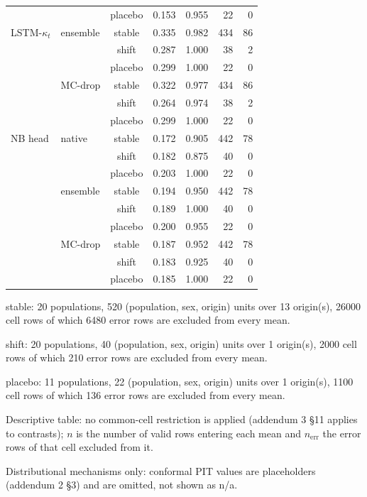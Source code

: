 {\begin{longtable}{@{}llcrrrr@{}}
 &  & placebo & 0.153 & 0.955 & 22 & 0 \\
\addlinespace[2pt]
LSTM-$\kappa_t$ & ensemble & stable & 0.335 & 0.982 & 434 & 86 \\
 &  & shift & 0.287 & 1.000 & 38 & 2 \\
 &  & placebo & 0.299 & 1.000 & 22 & 0 \\
 & MC-drop & stable & 0.322 & 0.977 & 434 & 86 \\
 &  & shift & 0.264 & 0.974 & 38 & 2 \\
 &  & placebo & 0.299 & 1.000 & 22 & 0 \\
\addlinespace[2pt]
NB head & native & stable & 0.172 & 0.905 & 442 & 78 \\
 &  & shift & 0.182 & 0.875 & 40 & 0 \\
 &  & placebo & 0.203 & 1.000 & 22 & 0 \\
 & ensemble & stable & 0.194 & 0.950 & 442 & 78 \\
 &  & shift & 0.189 & 1.000 & 40 & 0 \\
 &  & placebo & 0.200 & 0.955 & 22 & 0 \\
 & MC-drop & stable & 0.187 & 0.952 & 442 & 78 \\
 &  & shift & 0.183 & 0.925 & 40 & 0 \\
 &  & placebo & 0.185 & 1.000 & 22 & 0 \\
\end{longtable}
\noindent\begin{minipage}{\linewidth}\scriptsize\raggedright
\noindent stable: 20 populations, 520 (population, sex, origin) units over 13 origin(s), 26000 cell rows of which 6480 error rows are excluded from every mean.\par
\noindent shift: 20 populations, 40 (population, sex, origin) units over 1 origin(s), 2000 cell rows of which 210 error rows are excluded from every mean.\par
\noindent placebo: 11 populations, 22 (population, sex, origin) units over 1 origin(s), 1100 cell rows of which 136 error rows are excluded from every mean.\par
\noindent Descriptive table: no common-cell restriction is applied (addendum 3 \S11 applies to contrasts); $n$ is the number of valid rows entering each mean and $n_{\mathrm{err}}$ the error rows of that cell excluded from it.\par
\noindent Distributional mechanisms only: conformal PIT values are placeholders (addendum 2 \S3) and are omitted, not shown as n/a.\par

\end{minipage}}
